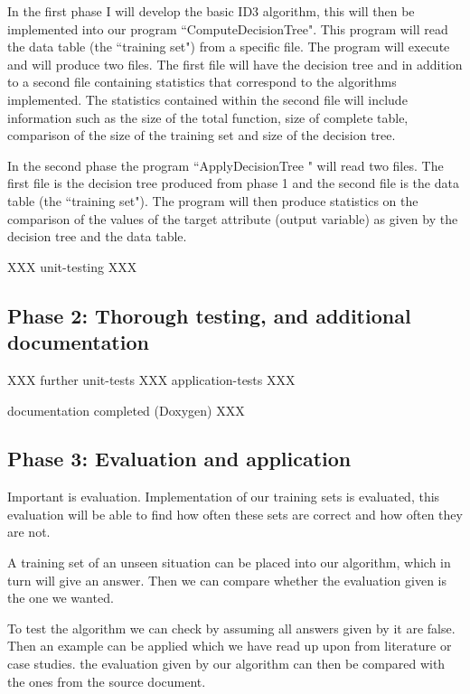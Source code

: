 \documentclass{report}
\begin{document}
In the first phase I will develop the basic ID3 algorithm, this will then be implemented into our program ``ComputeDecisionTree". This program will read the data table (the ``training set") from a specific file. The program will execute and will produce two files. The first file will have the decision tree and in addition to a second file containing statistics that correspond to the algorithms implemented. The statistics contained within the second file will 
include information such as the size of the total function, size of complete table, comparison of the size of the training set and size of the decision tree.

In the second phase the program ``ApplyDecisionTree " will read two files. The first file is the decision tree produced from phase 1 and the second file is the data table (the ``training set"). The program will then produce statistics on the comparison of the values of the target attribute (output variable) as given by the decision tree and the data table.

XXX unit-testing XXX


\subsection{Phase 2: Thorough testing, and additional documentation}
\label{sec:phase2}

XXX further unit-tests XXX application-tests XXX

documentation completed (Doxygen) XXX


\subsection{Phase 3: Evaluation and application}
\label{sec:phase3}

Important is evaluation. Implementation of our training sets is evaluated, this evaluation will be able to find how often these sets are correct and how often they are not.

A training set of an unseen situation can be placed into our algorithm, which in turn will give an answer. Then we can compare whether the evaluation given is the one we wanted.

To test the algorithm we can check by assuming all answers given by it are false. Then an example can be applied which we have read up upon from literature or case studies. the evaluation given by our algorithm can then be compared with the ones from the source document.
\end{document}
